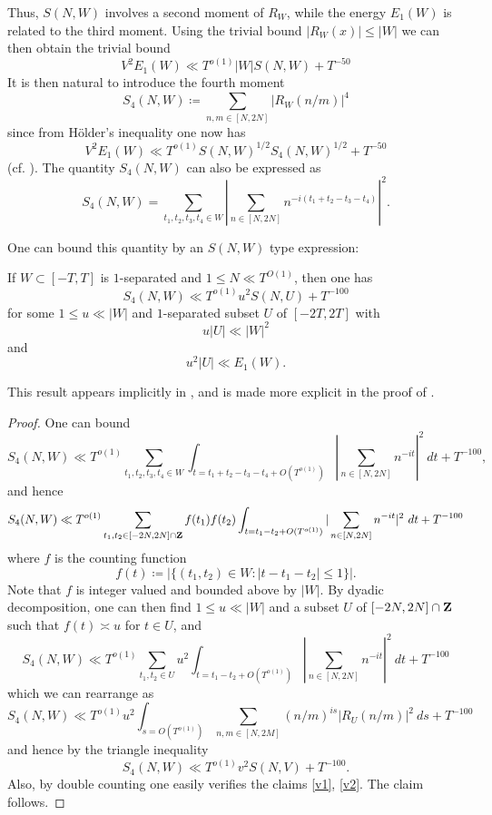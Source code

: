Thus, $S(N,W)$ involves a second moment of $R_W$, while the energy $E_1(W)$ is related to the third moment.  Using the trivial bound $|R_W(x)| \leq |W|$ we can then obtain the trivial bound
\begin{equation}\label{energy-triv}
V^2 E_1(W) \ll T^{o(1)} |W| S(N,W) + T^{-50}
\end{equation}
It is then natural to introduce the fourth moment
$$ S_4(N,W) \coloneqq \sum_{n,m \in [N,2N]} |R_W(n/m)|^4$$
since from H\"older's inequality one now has
\begin{equation}\label{v1w}
    V^2 E_1(W) \ll T^{o(1)} S(N,W)^{1/2} S_4(N,W)^{1/2} + T^{-50}
\end{equation}
(cf. \cite[Lemma 3]{heath_brown_consecutive_II}).  The quantity $S_4(N,W)$ can also be expressed as
$$ S_4(N,W) = \sum_{t_1,t_2,t_3,t_4 \in W} |\sum_{n \in [N,2N]} n^{-i(t_1+t_2-t_3-t_4)}|^2.$$

One can bound this quantity by an $S(N,W)$ type expression:

\begin{lemma}\label{wtu} If $W \subset [-T,T]$ is $1$-separated and $1 \leq N \ll T^{O(1)}$, then one has
$$ S_4(N,W) \ll T^{o(1)} u^2 S(N,U) + T^{-100}$$
for some $1 \leq u \ll |W|$ and $1$-separated subset $U$ of $[-2T,2T]$ with
\begin{equation}\label{v1}
 u |U| \ll |W|^2
\end{equation}
and
\begin{equation}\label{v2}
     u^2 |U| \ll E_1(W).
\end{equation}
\end{lemma}

This result appears implicitly in \cite[p. 229]{heath_brown_consecutive_II}, and is made more explicit in the proof of \cite[Lemma 11.6]{guth-maynard}.

\begin{proof} One can bound
    $$ S_4(N,W) \ll T^{o(1)} \sum_{t_1,t_2,t_3,t_4 \in W} \int_{t = t_1+t_2-t_3-t_4+O(T^{o(1)})} |\sum_{n \in [N,2N]} n^{-it}|^2\ dt + T^{-100},$$
    and hence
    $$ S_4(N,W) \ll T^{o(1)} \sum_{t_1,t_2 \in [-2N,2N] \cap \mathbf{Z}} f(t_1) f(t_2) \int_{t = t_1-t_2+O(T^{o(1)})} |\sum_{n \in [N,2N]} n^{-it}|^2\ dt + T^{-100}$$
where $f$ is the counting function
$$ f(t) \coloneqq |\{ (t_1,t_2) \in W: |t-t_1-t_2| \leq 1 \}|.$$
Note that $f$ is integer valued and bounded above by $|W|$. By dyadic decomposition, one can then find $1 \leq u \ll |W|$ and a subset $U$ of $[-2N,2N] \cap \mathbf{Z}$ such that $f(t) \asymp u$ for $t \in U$, and
$$ S_4(N,W) \ll T^{o(1)} \sum_{t_1,t_2 \in U} u^2 \int_{t = t_1-t_2+O(T^{o(1)})} |\sum_{n \in [N,2N]} n^{-it}|^2\ dt + T^{-100}$$
which we can rearrange as
$$ S_4(N,W) \ll T^{o(1)} u^2 \int_{s = O(T^{o(1)})} \sum_{n,m \in [N,2M]} (n/m)^{is} |R_U(n/m)|^2\ ds + T^{-100}$$
and hence by the triangle inequality
$$ S_4(N,W) \ll T^{o(1)} v^2 S(N,V) + T^{-100}.$$
Also, by double counting one easily verifies the claims \eqref{v1}, \eqref{v2}.  The claim follows.
\end{proof}


